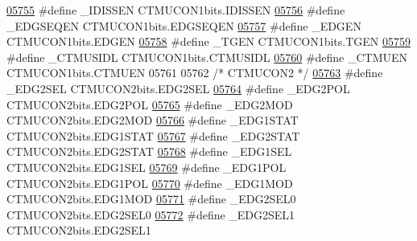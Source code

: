 \begin{DoxyCode}
\hypertarget{a00015_source_l05755}{}\hyperlink{a00015_ae86b0aede94b3059d5b1097776ff4955}{05755} \textcolor{preprocessor}{#define \_IDISSEN CTMUCON1bits.IDISSEN}
\hypertarget{a00015_source_l05756}{}\hyperlink{a00015_a6552e0c8f8fb5d3cf02f729fc6ad6d41}{05756} \textcolor{preprocessor}{#define \_EDGSEQEN CTMUCON1bits.EDGSEQEN}
\hypertarget{a00015_source_l05757}{}\hyperlink{a00015_a3a4786ccebe073dd9f50edf281867a45}{05757} \textcolor{preprocessor}{#define \_EDGEN CTMUCON1bits.EDGEN}
\hypertarget{a00015_source_l05758}{}\hyperlink{a00015_af6e0d28424a8fcc7f1e891561627446f}{05758} \textcolor{preprocessor}{#define \_TGEN CTMUCON1bits.TGEN}
\hypertarget{a00015_source_l05759}{}\hyperlink{a00015_a256e35c44b80322d6cad2c22961473f3}{05759} \textcolor{preprocessor}{#define \_CTMUSIDL CTMUCON1bits.CTMUSIDL}
\hypertarget{a00015_source_l05760}{}\hyperlink{a00015_a3c81a1dad8cf8e2172cf32abd8dc5c32}{05760} \textcolor{preprocessor}{#define \_CTMUEN CTMUCON1bits.CTMUEN}
05761 
05762 \textcolor{comment}{/* CTMUCON2 */}
\hypertarget{a00015_source_l05763}{}\hyperlink{a00015_ab424d579c9f7692e9ef780eb0ca1e57b}{05763} \textcolor{preprocessor}{#define \_EDG2SEL CTMUCON2bits.EDG2SEL}
\hypertarget{a00015_source_l05764}{}\hyperlink{a00015_a7487b99f0c40afa73a7f1ce3cf7a689c}{05764} \textcolor{preprocessor}{#define \_EDG2POL CTMUCON2bits.EDG2POL}
\hypertarget{a00015_source_l05765}{}\hyperlink{a00015_a27fef9c91a5e316d9659df86747b3f31}{05765} \textcolor{preprocessor}{#define \_EDG2MOD CTMUCON2bits.EDG2MOD}
\hypertarget{a00015_source_l05766}{}\hyperlink{a00015_aa1b8c4a05816fe8b5d8ba0cfea2d3080}{05766} \textcolor{preprocessor}{#define \_EDG1STAT CTMUCON2bits.EDG1STAT}
\hypertarget{a00015_source_l05767}{}\hyperlink{a00015_a2e76b281b956025dd136e5e18e0bc753}{05767} \textcolor{preprocessor}{#define \_EDG2STAT CTMUCON2bits.EDG2STAT}
\hypertarget{a00015_source_l05768}{}\hyperlink{a00015_aa988f8c4c00ead61ef083b553e22577a}{05768} \textcolor{preprocessor}{#define \_EDG1SEL CTMUCON2bits.EDG1SEL}
\hypertarget{a00015_source_l05769}{}\hyperlink{a00015_a2299024a1b158ed63fd7950196635cd4}{05769} \textcolor{preprocessor}{#define \_EDG1POL CTMUCON2bits.EDG1POL}
\hypertarget{a00015_source_l05770}{}\hyperlink{a00015_a98d5f6d14755f3b9be7fb19198614552}{05770} \textcolor{preprocessor}{#define \_EDG1MOD CTMUCON2bits.EDG1MOD}
\hypertarget{a00015_source_l05771}{}\hyperlink{a00015_a60ab718c93c5b6aaf74a19ab0b181244}{05771} \textcolor{preprocessor}{#define \_EDG2SEL0 CTMUCON2bits.EDG2SEL0}
\hypertarget{a00015_source_l05772}{}\hyperlink{a00015_a1232812f0bb95bf20bf0b169c371a277}{05772} \textcolor{preprocessor}{#define \_EDG2SEL1 CTMUCON2bits.EDG2SEL1}

\end{DoxyCode}
